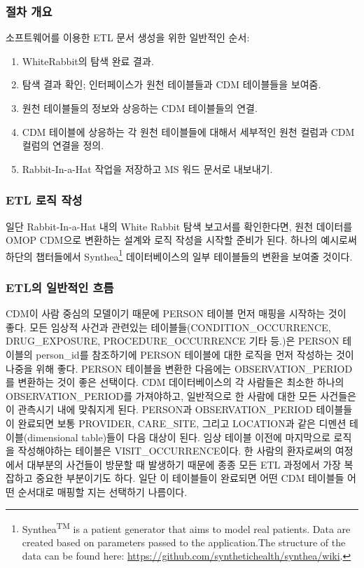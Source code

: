 \documentclass[11pt]{book}
\providecommand{\tightlist}{%
  \setlength{\itemsep}{0pt}\setlength{\parskip}{0pt}}
\let\rmarkdownfootnote\footnote%
\def\footnote{\protect\rmarkdownfootnote}
\theoremstyle{definition}
\theoremstyle{definition}
\theoremstyle{definition}
\theoremstyle{remark}
\begin{document}
\subsubsection*{절차 개요}\label{--1}

소프트웨어를 이용한 ETL 문서 생성을 위한 일반적인 순서:

\begin{enumerate}
\def\labelenumi{\arabic{enumi}.}
\tightlist
\item
  WhiteRabbit의 탐색 완료 결과.
\item
  탐색 결과 확인; 인터페이스가 원천 테이블들과 CDM 테이블들을 보여줌.
\item
  원천 테이블들의 정보와 상응하는 CDM 테이블들의 연결.
\item
  CDM 테이블에 상응하는 각 원천 테이블들에 대해서 세부적인 원천 컬럼과
  CDM 컬럼의 연결을 정의.
\item
  Rabbit-In-a-Hat 작업을 저장하고 MS 워드 문서로 내보내기.
\end{enumerate}

\subsubsection*{ETL 로직 작성}\label{etl--}

일단 Rabbit-In-a-Hat 내의 White Rabbit 탐색 보고서를 확인한다면, 원천
데이터를 OMOP CDM으로 변환하는 설계와 로직 작성을 시작할 준비가 된다.
하나의 예시로써 하단의 챕터들에서 Synthea\footnote{Synthea\textsuperscript{TM}
  is a patient generator that aims to model real patients. Data are
  created based on parameters passed to the application.The structure of
  the data can be found here:
  \url{https://github.com/synthetichealth/synthea/wiki}.} 데이터베이스의
일부 테이블들의 변환을 보여줄 것이다.

\subsubsection*{ETL의 일반적인 흐름}\label{etl--}

CDM이 사람 중심의 모델이기 때문에 PERSON 테이블 먼저 매핑을 시작하는
것이 좋다. 모든 임상적 사건과 관련있는 테이블들(CONDITION\_OCCURRENCE,
DRUG\_EXPOSURE, PROCEDURE\_OCCURRENCE 기타 등.)은 PERSON 테이블의
person\_id를 참조하기에 PERSON 테이블에 대한 로직을 먼저 작성하는 것이
나중을 위해 좋다. PERSON 테이블을 변환한 다음에는 OBSERVATION\_PERIOD를
변환하는 것이 좋은 선택이다. CDM 데이터베이스의 각 사람들은 최소한
하나의 OBSERVATION\_PERIOD를 가져야하고, 일반적으로 한 사람에 대한 모든
사건들은 이 관측시기 내에 맞춰지게 된다. PERSON과 OBSERVATION\_PERIOD
테이블들이 완료되면 보통 PROVIDER, CARE\_SITE, 그리고 LOCATION과 같은
디멘션 테이블(dimensional table)들이 다음 대상이 된다. 임상 테이블
이전에 마지막으로 로직을 작성해야하는 테이블은 VISIT\_OCCURRENCE이다. 한
사람의 환자로써의 여정에서 대부분의 사건들이 방문할 때 발생하기 때문에
종종 모든 ETL 과정에서 가장 복잡하고 중요한 부분이기도 하다. 일단 이
테이블들이 완료되면 어떤 CDM 테이블들 어떤 순서대로 매핑할 지는 선택하기
나름이다.
\end{document}
